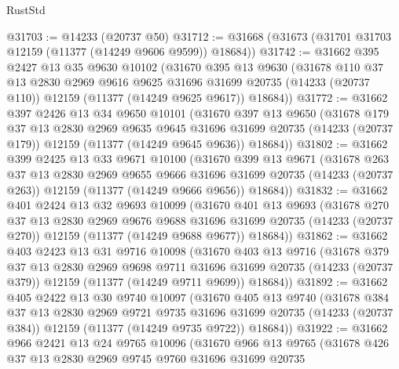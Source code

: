 \begin{lexlean}{RustStd}
\begin{coremodule}
@31703 := @14233 (@20737 @50)
@31712 := @31668 (@31673 (@31701 @31703 @12159 (@11377 (@14249 @9606 @9599)) @18684))
@31742 := @31662
    @395
    @2427
    @13
    @35
    @9630
    @10102
    (@31670
      @395
      @13
      @9630
      (@31678
        @110
        @37
        @13
        @2830
        @2969
        @9616
        @9625
        @31696
        @31699
        @20735
        (@14233 (@20737 @110))
        @12159
        (@11377 (@14249 @9625 @9617))
        @18684))
@31772 := @31662
    @397
    @2426
    @13
    @34
    @9650
    @10101
    (@31670
      @397
      @13
      @9650
      (@31678
        @179
        @37
        @13
        @2830
        @2969
        @9635
        @9645
        @31696
        @31699
        @20735
        (@14233 (@20737 @179))
        @12159
        (@11377 (@14249 @9645 @9636))
        @18684))
@31802 := @31662
    @399
    @2425
    @13
    @33
    @9671
    @10100
    (@31670
      @399
      @13
      @9671
      (@31678
        @263
        @37
        @13
        @2830
        @2969
        @9655
        @9666
        @31696
        @31699
        @20735
        (@14233 (@20737 @263))
        @12159
        (@11377 (@14249 @9666 @9656))
        @18684))
@31832 := @31662
    @401
    @2424
    @13
    @32
    @9693
    @10099
    (@31670
      @401
      @13
      @9693
      (@31678
        @270
        @37
        @13
        @2830
        @2969
        @9676
        @9688
        @31696
        @31699
        @20735
        (@14233 (@20737 @270))
        @12159
        (@11377 (@14249 @9688 @9677))
        @18684))
@31862 := @31662
    @403
    @2423
    @13
    @31
    @9716
    @10098
    (@31670
      @403
      @13
      @9716
      (@31678
        @379
        @37
        @13
        @2830
        @2969
        @9698
        @9711
        @31696
        @31699
        @20735
        (@14233 (@20737 @379))
        @12159
        (@11377 (@14249 @9711 @9699))
        @18684))
@31892 := @31662
    @405
    @2422
    @13
    @30
    @9740
    @10097
    (@31670
      @405
      @13
      @9740
      (@31678
        @384
        @37
        @13
        @2830
        @2969
        @9721
        @9735
        @31696
        @31699
        @20735
        (@14233 (@20737 @384))
        @12159
        (@11377 (@14249 @9735 @9722))
        @18684))
@31922 := @31662
    @966
    @2421
    @13
    @24
    @9765
    @10096
    (@31670
      @966
      @13
      @9765
      (@31678
        @426
        @37
        @13
        @2830
        @2969
        @9745
        @9760
        @31696
        @31699
        @20735

\end{coremodule}
\end{lexlean}
